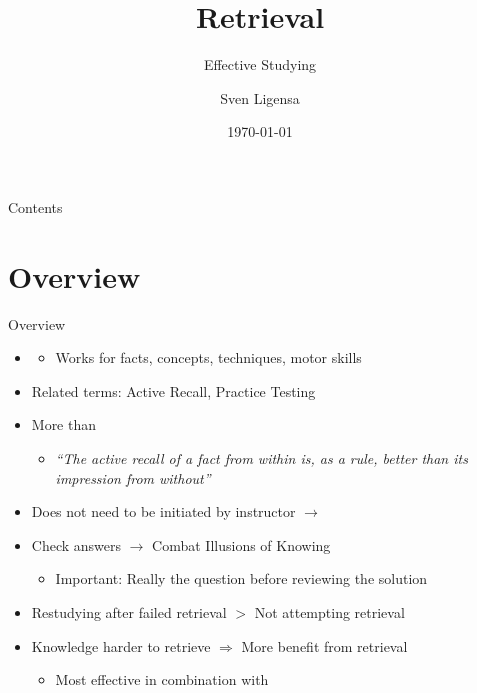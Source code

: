 \documentclass{ercisbeamer}
\title{Retrieval}
\subtitle{Effective Studying}
\author{Sven Ligensa}
\institute{European Research Center for Information Systems (ERCIS)}
\date{\today}
\begin{document}
\begin{frame}
    \begin{tbox}
        \titlepage
    \end{tbox}
\end{frame}
\setbgimage{}

\begin{frame}{Contents}
    \tableofcontents
\end{frame}

\section{Overview}
\begin{frame}{Overview}
    \begin{itemize}
        \item {}
        \begin{itemize}
            \item Works for facts, concepts, techniques, motor skills
        \end{itemize}
        \item Related terms: Active Recall, Practice Testing
        \item More than 
        \begin{itemize}
            \item \emph{``The active recall of a fact from within is, as a rule, better than its impression from without'' }
        \end{itemize}
        \item Does not need to be initiated by instructor $\rightarrow$ 
        \item Check answers $\rightarrow$ Combat Illusions of Knowing 
        \begin{itemize}
            \item Important: Really  the question before reviewing the solution
        \end{itemize}
        \item Restudying after failed retrieval $>$ Not attempting retrieval
        \item Knowledge harder to retrieve $\Rightarrow$ More benefit from retrieval
        \begin{itemize}
            \item Most effective in combination with 
        \end{itemize}
    \end{itemize}
\end{frame}
\end{document}
